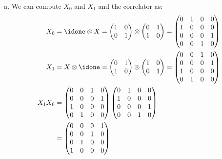 \documentclass[12pt]{extarticle}
\begin{document}
\begin{enumerate}[(a)]
\item We can compute $X_0$ and $X_1$ and the correlator as:
\begin{align*}
X_0 & = \idone\otimes X = \begin{pmatrix}1&0\\0&1\end{pmatrix}\otimes\begin{pmatrix}0&1\\1&0\end{pmatrix} = \begin{pmatrix}0&1&0&0\\1&0&0&0\\0&0&0&1\\0&0&1&0\end{pmatrix} \\
X_1 & = X\otimes\idone = \begin{pmatrix}0&1\\1&0\end{pmatrix}\otimes\begin{pmatrix}1&0\\0&1\end{pmatrix} = \begin{pmatrix}0&0&1&0\\0&0&0&1\\1&0&0&0\\0&1&0&0\end{pmatrix} \\
X_1X_0 & = \begin{pmatrix}0&0&1&0\\0&0&0&1\\1&0&0&0\\0&1&0&0\end{pmatrix}\begin{pmatrix}0&1&0&0\\1&0&0&0\\0&0&0&1\\0&0&1&0\end{pmatrix} \\
& = \begin{pmatrix}0&0&0&1\\0&0&1&0\\0&1&0&0\\1&0&0&0\end{pmatrix}
\end{align*}


\end{enumerate}
\end{document}
